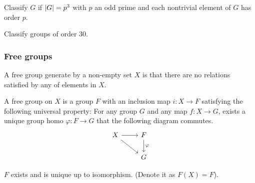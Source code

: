 \begin{exercise}
  Classify $G$ if $\lvert G\rvert = p^3$ with $p$ an odd prime and each nontrivial element of $G$ has order $p$.
\end{exercise}

\begin{exercise}
  Classify groups of order $30$.
\end{exercise}

\subsubsection{Free groups}
A free group generate by a non-empty set $X$ is that
there are no relations satisfied by any of elements in $X$.

\begin{definition}
  A free group on $X$ is a group $F$ with an inclusion map $i: X \to F$ satisfying the
  following universal property: For any group $G$ and any map $f: X \to G$,
  exists a unique group homo $\varphi : F \to G$ that the following diagram commutes.
  \[
    \begin{tikzcd}
    X \arrow[r]{i} \arrow[swap, dr]{f} & F \arrow{d}{\varphi} \\
    & G
    \end{tikzcd}
  \]
\end{definition}

\begin{theorem}
  $F$ exists and is unique up to isomorphism. (Denote it as $F(X) = F$).
\end{theorem}

